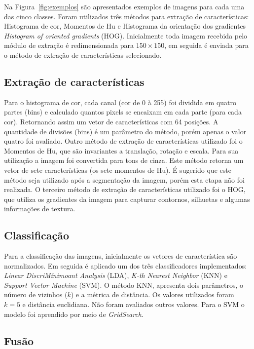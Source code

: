 \documentclass[journal]{IEEEtran}
\begin{document}
Na Figura~\ref{fig:exemplos} são apresentados exemplos de imagens para cada uma das cinco classes.
Foram utilizados três métodos para extração de características: Histograma de cor, Momentos de Hu e Histograma da orientação dos gradientes {\it Histogram of oriented gradients} (HOG).
Inicialmente toda imagem recebida pelo módulo de extração é redimensionada para $150 \times 150$, em seguida é enviada para o método de extração de características selecionado.

\subsection{Extração de características}

Para o histograma de cor, cada canal (cor de 0 à 255) foi dividida em quatro partes (bins) e calculado quantos pixels se encaixam em cada parte (para cada cor). 
Retornando assim um vetor de características com 64 posições.
A quantidade de divisões (bins) é um parâmetro do método, porém apenas o valor quatro foi avaliado.
Outro método de extração de características utilizado foi o Momentos de Hu, que são invariantes a translação, rotação e escala.
Para sua utilização a imagem foi convertida para tons de cinza. Este método retorna um vetor de sete características (os sete momentos de Hu).
É sugerido que este método seja utilizado após a segmentação da imagem, porém esta etapa não foi realizada.
O terceiro método de extração de características utilizado foi o HOG, que utiliza os gradientes da imagem para capturar contornos, silhuetas e algumas informações de textura.

\subsection{Classificação}

Para a classificação das imagens, inicialmente os vetores de característica são normalizados.
Em seguida é aplicado um dos três classificadores implementados: {\it Linear DiscriMínimoant Analysis} (LDA), {\it K-th Nearest Neighbor} (KNN) e {\it Support Vector Machine } (SVM).
O método KNN, apresenta dois parâmetros, o número de vizinhos ($k$) e a métrica de distância.
Os valores utilizados foram $k=5$ e distância euclidiana. Não foram avaliados outros valores.
Para o SVM o modelo foi aprendido por meio de {\it GridSearch}.

\subsection {Fusão}
\end{document}
